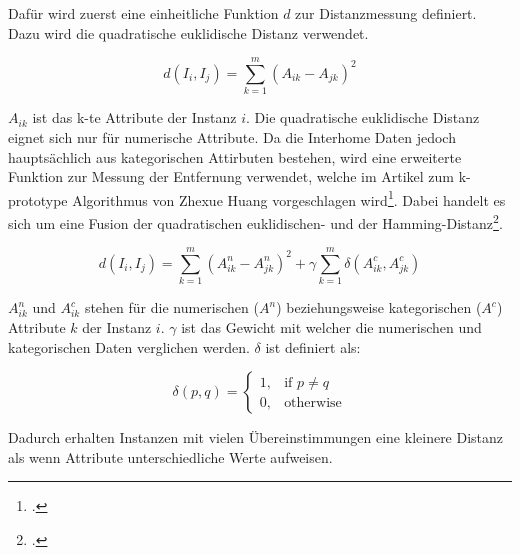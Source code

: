 
Dafür wird zuerst eine einheitliche Funktion $d$ zur Distanzmessung definiert.
Dazu wird die quadratische euklidische Distanz verwendet.


\begin{equation} \label{eq:konzept:clusteranalysis:1}
d(I_i, I_j) = \sum_{k=1}^{m} (A_{ik} - A_{jk})^2
\end{equation}

$A_{ik}$ ist das k-te Attribute der Instanz $i$. 
Die quadratische euklidische Distanz eignet sich nur für numerische Attribute.
Da die Interhome Daten jedoch hauptsächlich aus kategorischen Attirbuten bestehen, wird  eine erweiterte Funktion zur Messung der Entfernung verwendet, welche im Artikel zum k-prototype Algorithmus von Zhexue Huang vorgeschlagen wird\footcite{clustering_numeric_and_categorical_values}.
Dabei handelt es sich um eine Fusion der quadratischen euklidischen- und der Hamming-Distanz\footcite{data_mining_concepts_and_techniques}.

\begin{equation} \label{eq:konzept:clusteranalysis:2}
 d(I_i, I_j) = \sum_{k=1}^{m} (A^n_{ik} - A^n_{jk})^2 + \gamma \sum_{k=1}^{m} \delta(A^c_{ik}, A^c_{jk})
\end{equation}

$A^n_{ik}$ und $A^c_{ik}$ stehen für die numerischen ($A^n$) beziehungsweise kategorischen ($A^c$) Attribute $k$ der Instanz $i$. 
$\gamma$ ist das Gewicht mit welcher die numerischen und kategorischen Daten verglichen werden.
$\delta$ ist definiert als:

\begin{equation} \label{eq:konzept:clusteranalysis:3}
\delta(p,q)= 
\begin{cases}
1,				& \text{if } p \neq q\\
0,              & \text{otherwise}
\end{cases}
\end{equation}

Dadurch erhalten Instanzen mit vielen Übereinstimmungen eine kleinere Distanz als wenn Attribute unterschiedliche Werte aufweisen.


